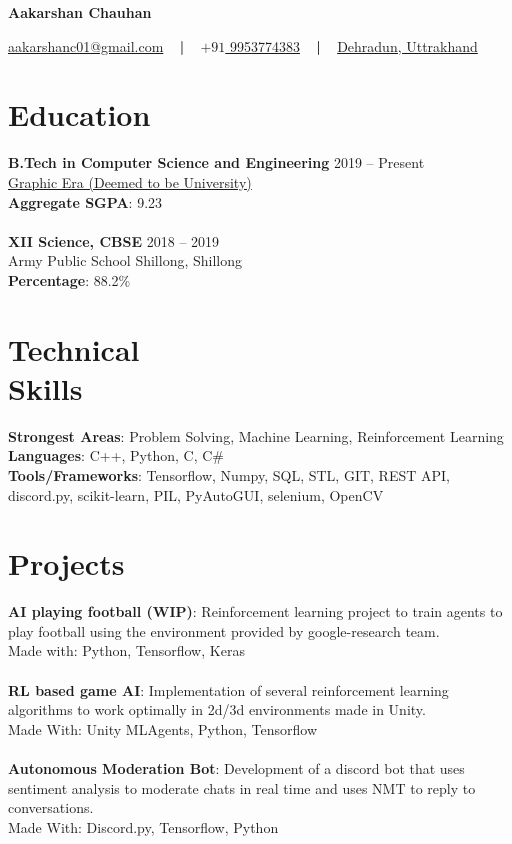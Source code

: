 \documentclass[margin, centered]{res}
\begin{document}
	\begin{center}
		\hspace{-\hoffset}
		\huge\bf{Aakarshan Chauhan}
	\end{center}
	\begin{center}
		\hspace{-\hoffset}
		\href{mailto:aakarshanc01@gmail.com}{aakarshanc01@gmail.com}
		~ \textbf{|} ~
		\href{tel:+919953774383}{\(+91\) 9953774383}
		~ \textbf{|} ~
		\href{https://goo.gl/maps/XCSUucDXrWkxxRdMA}{Dehradun, Uttrakhand}
	\end{center}

	\begin{resume}
		\section{Education}
			\textbf{B.Tech in Computer Science and Engineering} \hfill 2019 – Present \\
			\href{https://www.geu.ac.in/}{Graphic Era (Deemed to be University)}\\
			\textbf{Aggregate SGPA}: 9.23 \\ 
			\\
			\textbf{XII Science, CBSE} \hfill 2018 – 2019 \\
			Army Public School Shillong, Shillong \\
			\textbf{Percentage}: 88.2\%
		
		\section{Technical \\ Skills}
			\textbf{Strongest Areas}: Problem Solving, Machine Learning, Reinforcement Learning\\
			\textbf{Languages}: C++, Python, C, C\#\\
			\textbf{Tools/Frameworks}: Tensorflow, Numpy, SQL, STL, GIT, REST API, discord.py, scikit-learn, PIL, PyAutoGUI, selenium, OpenCV

		
		\section{Projects}
			\textbf{AI playing football (WIP)}:
			Reinforcement learning project to train agents to play football using the environment provided by google-research team.\\
			Made with: Python, Tensorflow, Keras
			\\ \\
			\textbf{RL based game AI}:
			Implementation of several reinforcement learning algorithms to work optimally in 2d/3d environments made in Unity.\\
			Made With: Unity MLAgents, Python, Tensorflow
			\\ \\
			\textbf{Autonomous Moderation Bot}:
			Development of a discord bot that uses sentiment analysis to moderate chats in real time and uses NMT to reply to conversations.\\
			Made With: Discord.py, Tensorflow, Python
			\\ \\

\end{resume}
\end{document}
